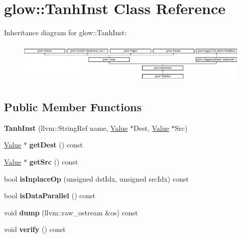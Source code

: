 \hypertarget{classglow_1_1_tanh_inst}{}\section{glow\+:\+:Tanh\+Inst Class Reference}
\label{classglow_1_1_tanh_inst}
Inheritance diagram for glow\+:\+:Tanh\+Inst\+:\begin{figure}[H]
\begin{center}
\leavevmode
\includegraphics[height=1.991111cm]{classglow_1_1_tanh_inst}
\end{center}
\end{figure}
\subsection*{Public Member Functions}
\begin{DoxyCompactItemize}
\item 
\mbox{\label{classglow_1_1_tanh_inst_a5a9bf61f2b62e9e3a5468869152f6115}} 
{\bfseries Tanh\+Inst} (llvm\+::\+String\+Ref name, \hyperlink{classglow_1_1_value}{Value} $\ast$Dest, \hyperlink{classglow_1_1_value}{Value} $\ast$Src)
\item 
\mbox{\label{classglow_1_1_tanh_inst_aa8f0dede8ad230a51aff4ba171b5af41}} 
\hyperlink{classglow_1_1_value}{Value} $\ast$ {\bfseries get\+Dest} () const
\item 
\mbox{\label{classglow_1_1_tanh_inst_a74dc6343964a1b938e5387652a733e36}} 
\hyperlink{classglow_1_1_value}{Value} $\ast$ {\bfseries get\+Src} () const
\item 
\mbox{\label{classglow_1_1_tanh_inst_a948a06477d5528abb3a81ac5b4ba32be}} 
bool {\bfseries is\+Inplace\+Op} (unsigned dst\+Idx, unsigned src\+Idx) const
\item 
\mbox{\label{classglow_1_1_tanh_inst_a0310c240e10c81f9c1e61aee17cc5d91}} 
bool {\bfseries is\+Data\+Parallel} () const
\item 
\mbox{\label{classglow_1_1_tanh_inst_a13ce5b89731a18bcee1ac9e0ff90022e}} 
void {\bfseries dump} (llvm\+::raw\+\_\+ostream \&os) const
\item 
\mbox{\label{classglow_1_1_tanh_inst_ad6f66231e65a1feeede5d495ecc79192}} 
void {\bfseries verify} () const
\end{DoxyCompactItemize}
